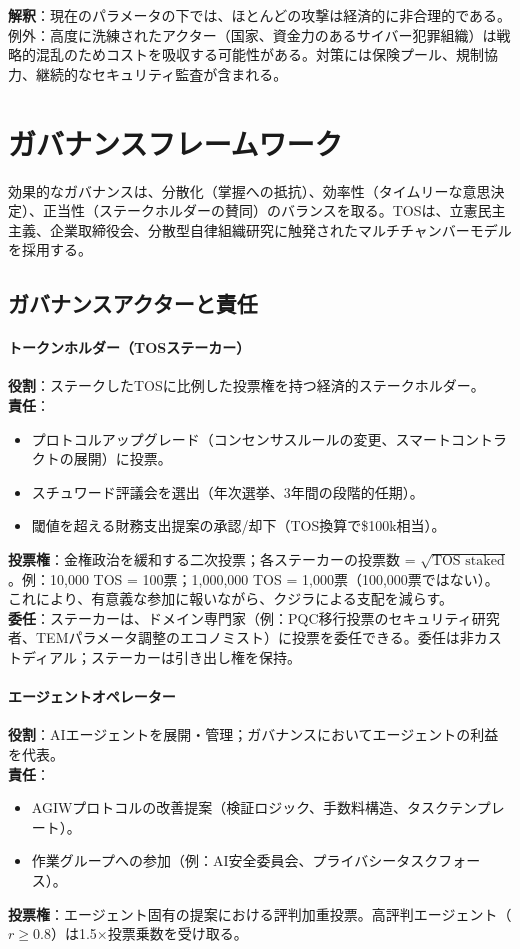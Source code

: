 \documentclass[11pt]{article}
\begin{document}
\textbf{解釈}：現在のパラメータの下では、ほとんどの攻撃は経済的に非合理的である。例外：高度に洗練されたアクター（国家、資金力のあるサイバー犯罪組織）は戦略的混乱のためコストを吸収する可能性がある。対策には保険プール、規制協力、継続的なセキュリティ監査が含まれる。

\section{ガバナンスフレームワーク}
\label{sec:governance}

効果的なガバナンスは、分散化（掌握への抵抗）、効率性（タイムリーな意思決定）、正当性（ステークホルダーの賛同）のバランスを取る。TOSは、立憲民主主義、企業取締役会、分散型自律組織研究に触発されたマルチチャンバーモデルを採用する。

\subsection{ガバナンスアクターと責任}

\paragraph{トークンホルダー（TOSステーカー）}
\textbf{役割}：ステークしたTOSに比例した投票権を持つ経済的ステークホルダー。\\
\textbf{責任}：
\begin{itemize}[noitemsep]
  \item プロトコルアップグレード（コンセンサスルールの変更、スマートコントラクトの展開）に投票。
  \item スチュワード評議会を選出（年次選挙、3年間の段階的任期）。
  \item 閾値を超える財務支出提案の承認/却下（TOS換算で\$100k相当）。
\end{itemize}
\textbf{投票権}：金権政治を緩和する二次投票；各ステーカーの投票数 = $\sqrt{\text{TOS staked}}$。例：10,000 TOS = 100票；1,000,000 TOS = 1,000票（100,000票ではない）。これにより、有意義な参加に報いながら、クジラによる支配を減らす。\\
\textbf{委任}：ステーカーは、ドメイン専門家（例：PQC移行投票のセキュリティ研究者、TEMパラメータ調整のエコノミスト）に投票を委任できる。委任は非カストディアル；ステーカーは引き出し権を保持。

\paragraph{エージェントオペレーター}
\textbf{役割}：AIエージェントを展開・管理；ガバナンスにおいてエージェントの利益を代表。\\
\textbf{責任}：
\begin{itemize}[noitemsep]
  \item AGIWプロトコルの改善提案（検証ロジック、手数料構造、タスクテンプレート）。
  \item 作業グループへの参加（例：AI安全委員会、プライバシータスクフォース）。
\end{itemize}
\textbf{投票権}：エージェント固有の提案における評判加重投票。高評判エージェント（$r \geq 0.8$）は1.5$\times$投票乗数を受け取る。
\end{document}
